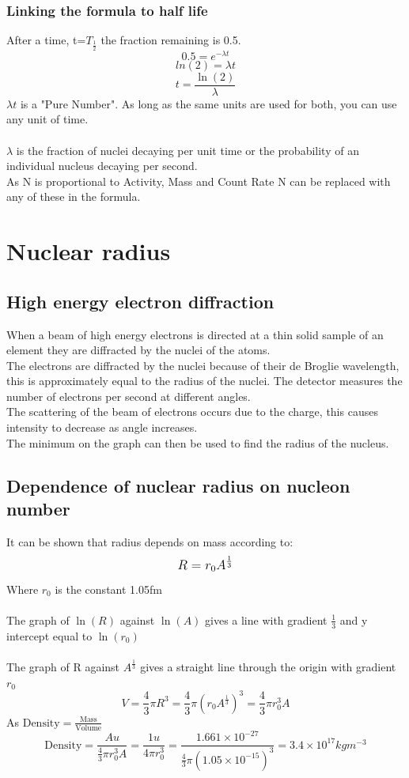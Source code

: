 \documentclass{article}[18pt]
\begin{document}
\subsubsection{Linking the formula to half life}
After a time, t=$T_{\frac{1}{2}}$ the fraction remaining is 0.5.
$$0.5=e^{-\lambda t}$$
$$ln(2)=\lambda t$$
$$t=\frac{\ln(2)}{\lambda}$$
$\lambda t$ is a "Pure Number". As long as the same units are used for both, you can use any unit of time.\\
\\
$\lambda$ is the fraction of nuclei decaying per unit time or the probability of an individual nucleus decaying per second.\\
As N is proportional to Activity, Mass and Count Rate N can be replaced with any of these in the formula.
\section{Nuclear radius}
\subsection{High energy electron diffraction}
When a beam of high energy electrons is directed at a thin solid sample of an element they are diffracted by the nuclei of the atoms.\\
The electrons are diffracted by the nuclei because of their de Broglie wavelength, this is approximately equal to the radius of the nuclei. The detector measures the number of electrons per second at different angles.\\
The scattering of the beam of electrons occurs due to the charge, this causes intensity to decrease as angle increases.\\
The minimum on the graph can then be used to find the radius of the nucleus.
\subsection{Dependence of nuclear radius on nucleon number}
It can be shown that radius depends on mass according to:
$$\mathlarger{R=r_0A^{\frac{1}{3}}}$$
Where $r_0$ is the constant 1.05fm\\
\\
The graph of $\ln(R)$ against $\ln(A)$ gives a line with gradient $\frac{1}{3}$ and y intercept equal to $\ln(r_0)$\\
\\
The graph of R against $A^{\frac{1}{3}}$ gives a straight line through the origin with gradient $r_0$\\
$$V=\frac{4}{3}\pi R^3=\frac{4}{3}\pi(r_0A^{\frac{1}{3}})^3=\frac{4}{3}\pi r_0^3A$$
As $\textrm{Density}=\frac{\textrm{Mass}}{\textrm{Volume}}$
$$\textrm{Density}=\frac{Au}{\frac{4}{3}\pi r_0^3A}=\frac{1u}{4\pi r_0^3}=\frac{1.661\times10^{-27}}{\frac{4}{3}\pi(1.05\times10^{-15})^3}=3.4\times10^{17}kgm^{-3}$$
\newpage
\end{document}
